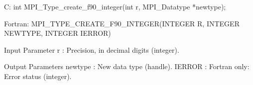 C:
int MPI_Type_create_f90_integer(int r, MPI_Datatype *newtype);

Fortran:
MPI_TYPE_CREATE_F90_INTEGER(INTEGER R, INTEGER NEWTYPE, INTEGER IERROR)

Input Parameter
r : Precision, in decimal digits (integer).

Output Parameters
newtype : New data type (handle).
IERROR : Fortran only: Error status (integer).
